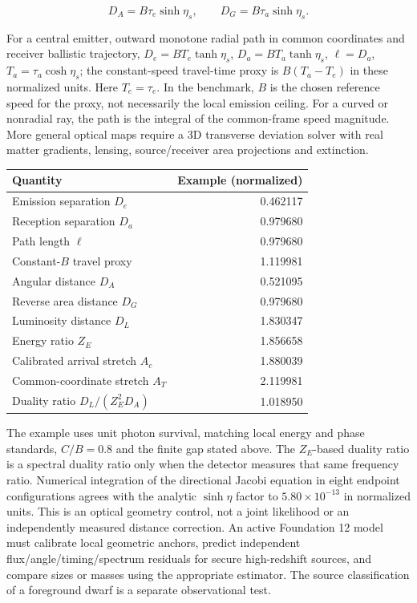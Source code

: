 \documentclass[
  11pt,
  twoside]{article}
\begin{document}
\[D_A=B\tau_e\sinh\eta_s,\qquad D_G=B\tau_a\sinh\eta_s.\tag{O2}\]

For a central emitter, outward monotone radial path in common
coordinates and receiver ballistic trajectory, \(D_e=B T_e\tanh\eta_s\),
\(D_a=B T_a\tanh\eta_s\), \(\ell=D_a\), \(T_a=\tau_a\cosh\eta_s\); the
constant-speed travel-time proxy is \(B(T_a-T_e)\) in these normalized
units. Here \(T_e=\tau_e\). In the benchmark, \(B\) is the chosen
reference speed for the proxy, not necessarily the local emission
ceiling. For a curved or nonradial ray, the path is the integral of the
common-frame speed magnitude. More general optical maps require a 3D
transverse deviation solver with real matter gradients, lensing,
source/receiver area projections and extinction.

\begin{longtable}[]{@{}lr@{}}
\toprule\noalign{}
Quantity & Example (normalized) \\
\midrule\noalign{}
\endhead
\bottomrule\noalign{}
\endlastfoot
Emission separation \(D_e\) & 0.462117 \\
Reception separation \(D_a\) & 0.979680 \\
Path length \(\ell\) & 0.979680 \\
Constant-\(B\) travel proxy & 1.119981 \\
Angular distance \(D_A\) & 0.521095 \\
Reverse area distance \(D_G\) & 0.979680 \\
Luminosity distance \(D_L\) & 1.830347 \\
Energy ratio \(Z_E\) & 1.856658 \\
Calibrated arrival stretch \(A_c\) & 1.880039 \\
Common-coordinate stretch \(A_T\) & 2.119981 \\
Duality ratio \(D_L/(Z_E^2 D_A)\) & 1.018950 \\
\end{longtable}

The example uses unit photon survival, matching local energy and phase
standards, \(C/B=0.8\) and the finite gap stated above. The
\(Z_E\)-based duality ratio is a spectral duality ratio only when the
detector measures that same frequency ratio. Numerical integration of
the directional Jacobi equation in eight endpoint configurations agrees
with the analytic \(\sinh\eta\) factor to \(5.80\times10^{-13}\) in
normalized units. This is an optical geometry control, not a joint
likelihood or an independently measured distance correction. An active
Foundation 12 model must calibrate local geometric anchors, predict
independent flux/angle/timing/spectrum residuals for secure
high-redshift sources, and compare sizes or masses using the appropriate
estimator. The source classification of a foreground dwarf is a separate
observational test.
\end{document}
